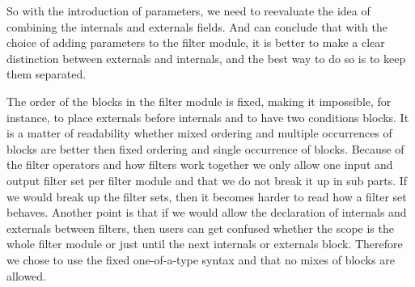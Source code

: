 So with the introduction of parameters, we need to reevaluate the idea of combining the internals and externals fields.
And can conclude that with the
choice of adding parameters to the filter module, it is better to make a clear distinction between externals and internals,
and the best way to do so is to keep them separated.

The order of the blocks in the filter module is fixed, making it impossible, for instance, to place externals before internals and to have two conditions blocks. It is
a matter of readability whether mixed ordering and multiple occurrences of blocks are better then fixed ordering and single occurrence of blocks.
Because of the filter operators and how filters work together we only allow one input and output filter set per filter module and that we do not break it up in sub parts. If we would
break up the filter sets, then it becomes harder to read how a filter set behaves.
Another point is that if we would allow the declaration of internals and externals between filters, then users can get confused whether the scope is the whole filter module or just until the next internals or externals block.
Therefore we chose to use the fixed one-of-a-type syntax and that no mixes of blocks are allowed.